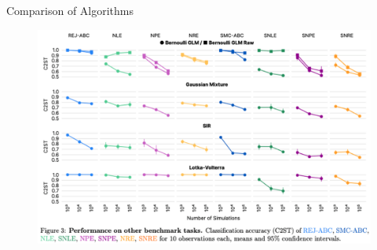 \documentclass[12pt, aspectratio=169]{beamer}
\begin{document}

\begin{frame}{Comparison of Algorithms}
\begin{figure}
        \centering
        \includegraphics[height=0.8\textheight]{"images/benchmarking_results_more_compact.png"}
        \caption{\cite{lueckmann_benchmarking_2021}}
    \end{figure}
\end{frame}
\end{document}
